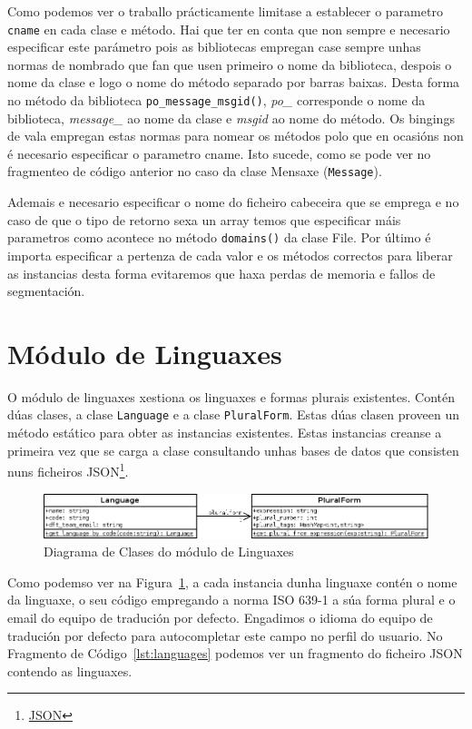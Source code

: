 Como podemos ver o traballo prácticamente limitase a establecer o parametro \lstinline{cname} en cada clase e método. Hai que ter en conta que non sempre e necesario especificar este parámetro pois as bibliotecas empregan case sempre unhas normas de nombrado que fan que usen primeiro o nome da biblioteca, despois o nome da clase e logo o nome do método separado por barras baixas. Desta forma no método da biblioteca \lstinline{po_message_msgid()}, \emph{po\_} corresponde o nome da biblioteca, \emph{message\_} ao nome da clase e \emph{msgid} ao nome do método. Os bingings de vala empregan estas normas para nomear os métodos polo que en ocasións non é necesario especificar o parametro cname. Isto sucede, como se pode ver no fragmenteo de código anterior no caso da clase Mensaxe (\lstinline{Message}).

Ademais e necesario especificar o nome do ficheiro cabeceira que se emprega e no caso de que o tipo de retorno sexa un array temos que especificar máis parametros como acontece no método \lstinline{domains()} da clase File. Por último é importa especificar a pertenza de cada valor e os métodos correctos para liberar as instancias desta forma evitaremos que haxa perdas de memoria e fallos de segmentación.

\section{Módulo de Linguaxes}
O módulo de linguaxes xestiona os linguaxes e formas plurais existentes. Contén dúas clases, a clase \lstinline{Language} e a clase \lstinline{PluralForm}. Estas dúas clasen proveen un método estático para obter as instancias existentes. Estas instancias creanse a primeira vez que se carga a clase consultando unhas bases de datos que consisten nuns ficheiros JSON\footnote{\href{http://gl.wikipedia.org/wiki/JSON}{JSON}}.

\begin{figure}[h!]
    \centering
    \includegraphics[width=\textwidth]{img/languages.png}
    \caption{Diagrama de Clases do módulo de Linguaxes}
    \label{fig:dia_class:languages}
\end{figure}

Como podemso ver na Figura~\ref{fig:dia_class:languages}, a cada instancia dunha linguaxe contén o nome da linguaxe, o seu código empregando a norma ISO 639-1 a súa forma plural e o email do equipo de tradución por defecto. Engadimos o idioma do equipo de tradución por defecto para autocompletar este campo no perfil do usuario. No Fragmento de Código~\ref{lst:languages} podemos ver un fragmento do ficheiro JSON contendo as linguaxes.

